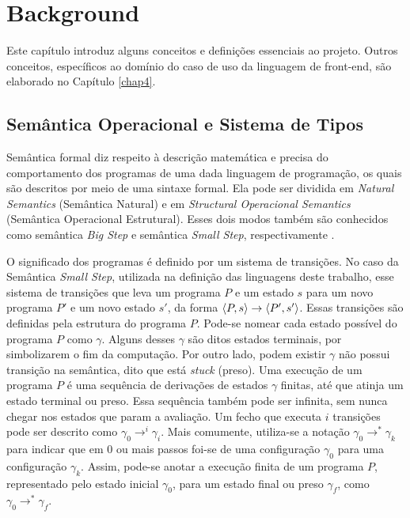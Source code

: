 \chapter{Background}

Este capítulo introduz alguns conceitos e definições essenciais ao projeto. 
Outros conceitos, específicos ao domínio do caso de uso da linguagem de front-end,
são elaborado no Capítulo \ref{chap4}. 

\section{Semântica Operacional e Sistema de Tipos}

Semântica formal diz respeito à descrição matemática e precisa do comportamento dos programas de uma dada linguagem de programação, os quais são descritos por meio de uma sintaxe formal. Ela pode ser dividida em \emph{Natural Semantics} (Semântica Natural) e em \emph{Structural Operacional Semantics} (Semântica Operacional Estrutural). Esses dois modos também são conhecidos como semântica \emph{Big Step} e semântica \emph{Small Step}, respectivamente \cite{NIELSON}.

O significado dos programas é definido por um sistema de transições. No caso da Semântica \emph{Small Step}, utilizada na definição das linguagens deste trabalho, esse sistema de transições que leva um programa $P$ e um estado $s$ para um novo programa $P'$ e um novo estado $s'$, da forma $\langle P, s \rangle \to \langle P', s' \rangle$. Essas transições são definidas pela estrutura do programa $P$. Pode-se nomear cada estado possível do programa $P$ como $\gamma$. Alguns desses $\gamma$ são ditos estados terminais, por simbolizarem o fim da computação. Por outro lado, podem existir $\gamma$ não possui transição na semântica, dito que está \emph{stuck} (preso). Uma execução de um programa $P$ é uma sequência de derivações de estados $\gamma$ finitas, até que atinja um estado terminal ou preso. Essa sequência também pode ser infinita, sem nunca chegar nos estados que param a avaliação. Um fecho que executa $i$ transições pode ser descrito como $\gamma_0 \to^i \gamma_i$. Mais comumente, utiliza-se a notação $\gamma_0 \to^* \gamma_k$ para indicar que em 0 ou mais passos foi-se de uma configuração $\gamma_0$ para uma configuração $\gamma_k$. Assim, pode-se anotar a execução finita de um programa $P$, representado pelo estado inicial $\gamma_0$, para um estado final ou preso $\gamma_f$, como $\gamma_0 \to^* \gamma_f$.

